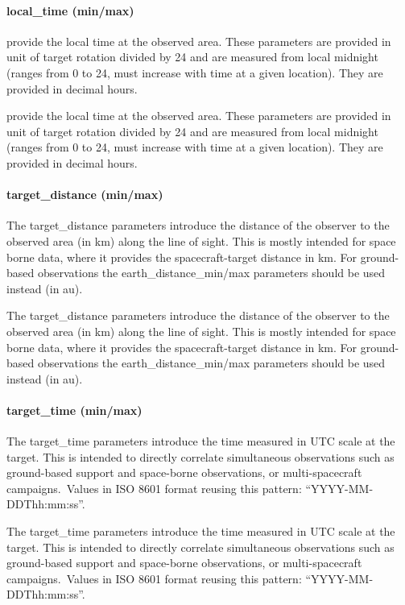 \documentclass[11pt,a4paper]{ivoa}
\begin{document}
\paragraph{local\_time (min/max)}

provide the local time at the observed area. These parameters are provided in unit of target rotation divided by 24 and are measured from local midnight (ranges from 0 to 24, must increase with time at a given location). They are provided in decimal hours.

provide the local time at the observed area. These parameters are provided in unit of target rotation divided by 24 and are measured from local midnight (ranges from 0 to 24, must increase with time at a given location). They are provided in decimal hours.

\paragraph{target\_distance (min/max)}

The target\_distance parameters introduce the distance of the observer to the observed area (in km) along the line of sight. This is mostly intended for space borne data, where it provides the spacecraft-target distance in km. For ground-based observations the earth\_distance\_min/max parameters should be used instead (in au).

The target\_distance parameters introduce the distance of the observer to the observed area (in km) along the line of sight. This is mostly intended for space borne data, where it provides the spacecraft-target distance in km. For ground-based observations the earth\_distance\_min/max parameters should be used instead (in au).

\paragraph{target\_time (min/max)}

The target\_time parameters introduce the time measured in UTC scale at the target. This is intended to directly correlate simultaneous observations such as ground-based support and space-borne observations, or multi-spacecraft campaigns. Values in ISO 8601 format reusing this pattern: “YYYY-MM-DDThh:mm:ss”. 

The target\_time parameters introduce the time measured in UTC scale at the target. This is intended to directly correlate simultaneous observations such as ground-based support and space-borne observations, or multi-spacecraft campaigns. Values in ISO 8601 format reusing this pattern: “YYYY-MM-DDThh:mm:ss”. 
\end{document}
